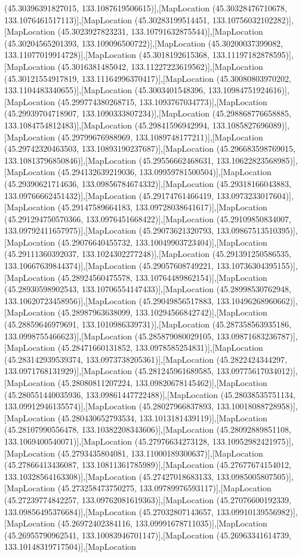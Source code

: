(45.30396391827015, 133.1087619506615)],[MapLocation (45.30328476710678, 133.1076461517113)],[MapLocation (45.30283199514451, 133.10756032102282)],[MapLocation (45.3023927823231, 133.10791632875544)],[MapLocation (45.30204565201393, 133.109096500722)],[MapLocation (45.30200037399082, 133.11077019914728)],[MapLocation (45.3018192615368, 133.11197182878595)],[MapLocation (45.3016381485042, 133.11227223619562)],[MapLocation (45.30121554917819, 133.11164996370417)],[MapLocation (45.30080803970202, 133.1104483340655)],[MapLocation (45.3003401548396, 133.10984751924616)],[MapLocation (45.299774380268715, 133.1093767034773)],[MapLocation (45.29939704718907, 133.1090333807234)],[MapLocation (45.298868776658885, 133.1084754812483)],[MapLocation (45.29841596942994, 133.1085827696089)],[MapLocation (45.29799676988969, 133.1089748177211)],[MapLocation (45.29742320463503, 133.10893190237687)],[MapLocation (45.296683598769015, 133.10813796850846)],[MapLocation (45.29556662468631, 133.10622823568985)],[MapLocation (45.294132639219036, 133.09959781500504)],[MapLocation (45.29390621714636, 133.09856784674332)],[MapLocation (45.29318166043883, 133.09766662451432)],[MapLocation (45.29174761466419, 133.0973233017604)],[MapLocation (45.29147589664183, 133.09728038641617)],[MapLocation (45.291294750570366, 133.0976451668422)],[MapLocation (45.29109850834007, 133.09792411657975)],[MapLocation (45.29073621320793, 133.09867513510395)],[MapLocation (45.29076640455732, 133.10049903723404)],[MapLocation (45.29111360392037, 133.1024302277248)],[MapLocation (45.291391250586535, 133.10667639844374)],[MapLocation (45.29057608749221, 133.10736304395155)],[MapLocation (45.28924560475578, 133.10764489862154)],[MapLocation (45.28930598902543, 133.10706554147433)],[MapLocation (45.28998530762948, 133.10620723458956)],[MapLocation (45.29049856517883, 133.10496268960662)],[MapLocation (45.28987963638099, 133.10294566842742)],[MapLocation (45.28859646979691, 133.1010986339731)],[MapLocation (45.287358563935186, 133.0998755466623)],[MapLocation (45.285879080029105, 133.09871683236787)],[MapLocation (45.28471660131852, 133.0978585254831)],[MapLocation (45.283142939539374, 133.0973738205361)],[MapLocation (45.2822424344297, 133.0971768131929)],[MapLocation (45.281245961689585, 133.09775617034012)],[MapLocation (45.28080811207224, 133.09820678145462)],[MapLocation (45.280551440035936, 133.09861447722488)],[MapLocation (45.28038535751134, 133.09912946135574)],[MapLocation (45.28027966837893, 133.10018088728958)],[MapLocation (45.280430652793534, 133.1013181439119)],[MapLocation (45.28107990556478, 133.10382208343606)],[MapLocation (45.28092889851108, 133.1069400540071)],[MapLocation (45.27976634273128, 133.10952982421975)],[MapLocation (45.2793435804081, 133.11000189300637)],[MapLocation (45.27866413436087, 133.10811361785989)],[MapLocation (45.27677674154012, 133.10328564163308)],[MapLocation (45.27427018683133, 133.0985005807505)],[MapLocation (45.273258473750275, 133.09789976593117)],[MapLocation (45.27239774842257, 133.09762081619363)],[MapLocation (45.27076600192339, 133.09856495376684)],[MapLocation (45.27032807143657, 133.09910139556982)],[MapLocation (45.26972402384116, 133.09991678711035)],[MapLocation (45.26955790962541, 133.10083946701147)],[MapLocation (45.26963341614739, 133.10148319717504)],[MapLocation 
